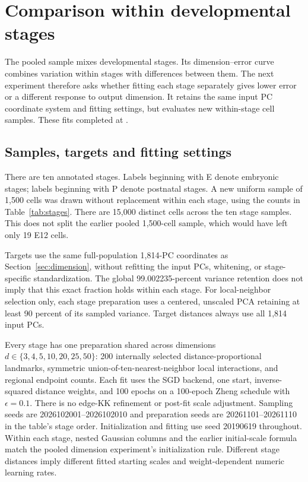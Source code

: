 \section{Comparison within developmental stages}\label{sec:stages}
The pooled sample mixes developmental stages. Its dimension--error curve
combines variation within stages with differences between them. The next
experiment therefore asks whether fitting each stage separately gives lower
error or a different response to output dimension. It retains the same input
PC coordinate system and fitting settings, but evaluates new within-stage
cell samples. These fits completed at \stagegenerated.

\subsection{Samples, targets and fitting settings}
There are ten annotated stages. Labels beginning with E denote embryonic
stages; labels beginning with P denote postnatal stages. A new uniform
sample of 1,500 cells was drawn without replacement within each stage,
using the counts in Table~\ref{tab:stages}. There are 15,000 distinct cells
across the ten stage samples. This does not split the earlier pooled
1,500-cell sample, which would have left only 19 E12 cells.

\begin{table}[htbp]
\centering
\caption{Available cells in the 120,804-cell input and the sample used per
developmental stage. Counts are cells, not biological replicates. Equal
sample sizes keep the number of evaluation pairs and landmark fraction
fixed; no stage is excluded.}
\label{tab:stages}
\end{table}

Targets use the same full-population 1,814-PC coordinates as
Section~\ref{sec:dimension}, without refitting the input PCs, whitening,
or stage-specific standardization. The global 99.002235-percent variance
retention does not imply that this exact fraction holds within each stage.
For local-neighbor selection only, each stage preparation uses a centered,
unscaled PCA retaining at least 90 percent of its sampled variance.
Target distances always use all 1,814 input PCs.

Every stage has one preparation shared across dimensions
$d\in\{3,4,5,10,20,25,50\}$: 200 internally selected distance-proportional
landmarks, symmetric union-of-ten-nearest-neighbor local interactions, and
regional endpoint counts. Each fit uses the SGD backend, one start,
inverse-squared distance weights, and 100 epochs on a 100-epoch Zheng
schedule with $\epsilon=0.1$. There is no edge-KK refinement or post-fit
scale adjustment. Sampling seeds are 2026102001--2026102010 and preparation
seeds are 20261101--20261110 in the table's stage order.
Initialization and fitting use seed 20190619 throughout. Within each
stage, nested Gaussian columns and the earlier initial-scale formula
match the pooled dimension experiment's initialization rule. Different
stage distances imply different fitted starting scales and weight-dependent
numeric learning rates.

